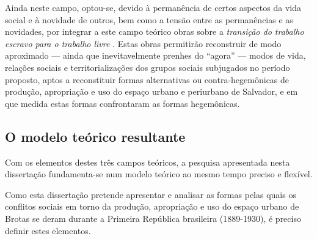Ainda neste campo, optou-se, devido à permanência de certos aspectos da vida social e à novidade de outros, bem como a tensão entre as permanências e as novidades, por integrar a este campo teórico obras sobre a \textit{transição do trabalho escravo para o trabalho livre }\cite{ANDRADE1988, AZEVEDO2004, brito2003abolicao, COSTA1991, DIAS2004, HOLTHE2003, mata2007libertos, MATTOS2008, MATTOSO1978, MATTOSO1992, MATTOSO1988, menezesfilho2007pos, MOURA1981, NASCIMENTO2007, REIS2000, REIS2004males, REISGOMES1996, REISSILVA1989, REIS2012, COSTA1989}. Estas obras permitirão reconstruir de modo aproximado --- ainda que inevitavelmente prenhes do ``agora'' \cite[p.~229-230]{BENJAMIN1987} --- modos de vida, relações sociais e territorializações dos grupos sociais subjugados no período proposto, aptos a reconstituir formas alternativas ou contra-hegemônicas de produção, apropriação e uso do espaço urbano e periurbano de Salvador, e em que medida estas formas confrontaram as formas hegemônicas.

\subsection[O modelo teórico resultante]{O modelo teórico resultante}
\label{subsec:modteoresult}

Com os elementos destes três campos teóricos, a pesquisa apresentada nesta dissertação fundamenta-se num modelo teórico ao mesmo tempo preciso e flexível. 

Como esta dissertação pretende apresentar e analisar as formas pelas quais os conflitos sociais em torno da produção, apropriação e uso do espaço urbano de Brotas se deram durante a Primeira República brasileira (1889-1930), é preciso definir estes elementos.

